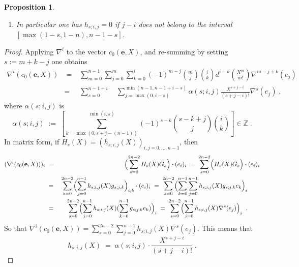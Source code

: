 \documentclass{compositio}
\newtheorem{proposition}[theorem]{Proposition}
\numberwithin{equation}{section}
\begin{document}
\begin{proposition}
\begin{enumerate}
\begin{equation}
h_{s;i,j}(X)\;=\;\alpha(s;i,j)\frac{X^{s+j-i}}{(s+j-i)!}
\end{equation}
with
\begin{equation}\label{alpha(s,i,j)}
\alpha(s;i,j)\;=\;
\epsilon_{s;i,j}\cdot\left[ 
\sum_{k=\max(0,s+j-(n-1))}^{\min(i,s)}(-1)^{s+k}\binom{s-k+j}{j}\binom{i}{k}\right]\in\mathbb{Z}
\end{equation}
where 
\begin{equation}
\epsilon_{s;i,j}\;=\;\left\{\begin{array}{rcl}
1&\textrm{ if }&(s,j)\in[0,n-1+i]\times[\max(0,i-s),\min(n-1,n-1+i-s)]\\
&&\\
0&\textrm{ if }&(s,j)\notin[0,n-1+i]\times[\max(0,i-s),\min(n-1,n-1+i-s)]
\end{array}\right.
\end{equation}
\fi
\item In particular one has 
$h_{s;i,j}=0$ if $j-i$ does not belong to the interval $[\max(1-s,1-n),n-1-s]$.
\end{enumerate}
\end{proposition}
\begin{proof}
Applying $\nabla^i$ to the vector $c_0({\mathbf{e}},X)$, and re-summing by setting $s:=m+k-j$ one obtains
\begin{eqnarray}
\nabla^i(c_0({\mathbf{e}},X))&\;=\;&\sum_{m=0}^{n-1}\sum_{j=0}^{m}\sum_{k=0}^i(-1)^{m-j}\binom{m}{j}\binom{i}{k}
d^{i-k}(\frac{X^m}{m!})\nabla^{m-j+k}(e_j)\\
&=&\sum_{s=0}^{n-1+i}\quad\sum_{j=\max(0,i-s)}^{\min(n-1,n-1+i-s)}\alpha(s;i,j)\frac{X^{s+j-i}}{(s+j-i)!}
\nabla^s(e_j)\;,
\end{eqnarray}
where $\alpha(s;i,j)$ is
\begin{equation}
\alpha(s;i,j)\;:=\;\left[ 
\sum_{k=\max(0,s+j-(n-1))}^{\min(i,s)}(-1)^{s-k}\binom{s-k+j}{j}\binom{i}{k}\right]\in\mathbb{Z}\;.
\end{equation} 
In matrix form, if $H_s(X)=(h_{s;i,j}(X))_{i,j=0,\ldots,n-1}$, then 
\begin{eqnarray}
(\nabla^i(c_0({\mathbf{e}},X)))_i&\;=\;&\Bigl(\sum_{s=0}^{2n-2}H_s(X)G_s\Bigr)\cdot(e_i)_i
\;=\;\sum_{s=0}^{2n-2}\Bigl(H_s(X)G_s\Bigr)\cdot(e_i)_i\\
&\;=\;&\sum_{s=0}^{2n-2}\Bigl(\sum_{j=0}^{n-1}h_{s;i,j}(X)g_{s;j,k}\Bigr)_{i,k}\cdot(e_i)_i
\;=\;\sum_{s=0}^{2n-2}\Bigl(\sum_{k=0}^{n-1}
\sum_{j=0}^{n-1}h_{s;i,j}(X)g_{s;j,k}e_k\Bigr)_{i}\qquad\\
&\;=\;&\sum_{s=0}^{2n-2}\Bigl(
\sum_{j=0}^{n-1}h_{s;i,j}(X)(\sum_{k=0}^{n-1}g_{s;j,k}e_k)\Bigr)_{i}\;=\;
\sum_{s=0}^{2n-2}\Bigl(
\sum_{j=0}^{n-1}h_{s;i,j}(X)\nabla^s(e_j)\Bigr)_{i}\;\;.\qquad
\end{eqnarray}
So that $\nabla^i(c_0({\mathbf{e}},X))=\sum_{s=0}^{2n-2}\sum_{j=0}^{n-1}h_{s;i,j}(X)\nabla^s(e_j)$. This means that 
\begin{equation}
h_{s;i,j}(X)\;=\;\alpha(s;i,j)\cdot\frac{X^{s+j-i}}{(s+j-i)!}\;.
\end{equation}
\end{proof}
\end{document}

